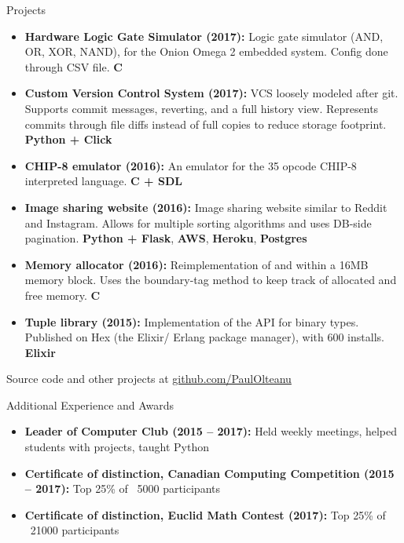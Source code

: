\documentclass[calibri]{mcdowellcv}
\begin{document}
    \begin{cvsection}{\Large{Projects}}
        \begin{cvsubsection}{}{}{}
            \begin{itemize}
                \item \textbf{Hardware Logic Gate Simulator (2017):} Logic gate simulator (AND, OR, XOR, NAND), for the Onion Omega 2 embedded system. Config done through CSV file. \textbf{C}
                \item \textbf{Custom Version Control System (2017):} VCS loosely modeled after git. Supports commit messages, reverting, and a full history view. Represents commits through file diffs instead of full copies to reduce storage footprint. \textbf{Python + Click}
                \item \textbf{CHIP-8 emulator (2016):} An emulator for the 35 opcode CHIP-8 interpreted language. \textbf{C + SDL}
                \item \textbf{Image sharing website (2016):} Image sharing website similar to Reddit and Instagram. Allows for multiple sorting algorithms and uses DB-side pagination. \textbf{Python + Flask}, \textbf{AWS}, \textbf{Heroku}, \textbf{Postgres}
                \item \textbf{Memory allocator (2016):} Reimplementation of  and  within a 16MB memory block. Uses the boundary-tag method to keep track of allocated and free memory. \textbf{C}
                \item \textbf{Tuple library (2015):} Implementation of the  API for binary types. Published on Hex (the Elixir/ Erlang package manager), with 600 installs. \textbf{Elixir}
            \end{itemize}
            Source code and other projects at \underline{github.com/PaulOlteanu}
        \end{cvsubsection}
    \end{cvsection}

    \begin{cvsection}{\Large{Additional Experience and Awards}}
        \begin{cvsubsection}{}{}{}
            \begin{itemize}
                \item \textbf{Leader of Computer Club (2015 -- 2017):} Held weekly meetings, helped students with projects, taught Python
                \item \textbf{Certificate of distinction, Canadian Computing Competition (2015 -- 2017):} Top 25\% of ~5000 participants
                \item \textbf{Certificate of distinction, Euclid Math Contest (2017):} Top 25\% of ~21000 participants
            \end{itemize}
        \end{cvsubsection}
    \end{cvsection}
\end{document}
